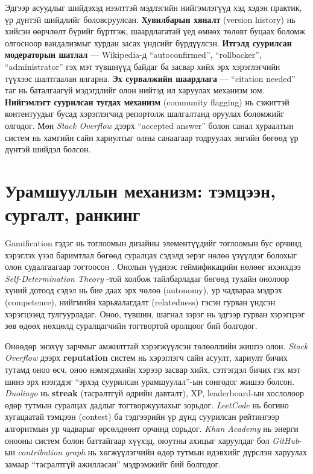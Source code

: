 Эдгээр асуудлыг шийдэхэд нээлттэй мэдлэгийн нийгэмлэгүүд хэд хэдэн практик, үр дүнтэй шийдлийг боловсруулсан. \textbf{Хувилбарын хяналт} (version history) нь хийсэн өөрчлөлт бүрийг бүртгэж, шаардлагатай үед өмнөх төлөвт буцаах боломж олгосноор вандализмыг хурдан засах үндсийг бүрдүүлсэн. \textbf{Итгэлд суурилсан модераторын шатлал} — Wikipedia-д ``autoconfirmed'', ``rollbacker'', ``administrator'' гэх мэт түвшнүүд байдаг ба засвар хийх эрх хэрэглэгчийн түүхээс шалтгаалан ялгарна. \textbf{Эх сурвалжийн шаардлага} — ``citation needed'' таг нь баталгаагүй мэдэгдлийг олон нийтэд ил харуулах механизм юм. \textbf{Нийгэмлэгт суурилсан тугдах механизм} (community flagging) нь сэжигтэй контентуудыг бусад хэрэглэгчид репортолж шалгалтанд оруулах боломжийг олгодог. Мөн \textit{Stack Overflow} дээрх ``accepted answer'' болон санал хураалтын систем нь хамгийн сайн хариултыг олны санаагаар тодруулах энгийн бөгөөд үр дүнтэй шийдэл болсон.


\section{Урамшууллын механизм: тэмцээн, сургалт, ранкинг}

Gamification гэдэг нь тоглоомын дизайны элементүүдийг тоглоомын бус орчинд хэрэглэх үзэл баримтлал бөгөөд суралцах сэдэлд эерэг нөлөө үзүүлдэг болохыг олон судалгаагаар тогтоосон \cite{Deterding2011}. Онолын үүднээс геймификацийн нөлөөг ихэнхдээ \textit{Self-Determination Theory} \cite{Deci2000}-той холбож тайлбарладаг бөгөөд тухайн онолоор хүний дотоод сэдэл нь бие даах эрх чөлөө (autonomy), ур чадвараа мэдрэх (competence), нийгмийн харьяалагдалт (relatedness) гэсэн гурван үндсэн хэрэгцээнд тулгуурладаг. Оноо, түвшин, шагнал зэрэг нь эдгээр гурван хэрэгцээг зөв өдөөх нөхцөлд суралцагчийн тогтвортой оролцоог бий болгодог.

Өнөөдөр энэхүү зарчмыг амжилттай хэрэгжүүлсэн төлөөллийн жишээ олон. \textit{Stack Overflow} дээрх \textbf{reputation} систем нь хэрэглэгч сайн асуулт, хариулт бичих тутамд оноо өсч, оноо нэмэгдэхийн хэрээр засвар хийх, сэтгэгдэл бичих гэх мэт шинэ эрх нээгддэг ``эрхэд суурилсан урамшуулал''-ын сонгодог жишээ болсон. \textit{Duolingo} нь \textbf{streak} (тасралтгүй өдрийн давталт), XP, leaderboard-ын хослолоор өдөр тутмын суралцах дадлыг тогтворжуулахыг зорьдог. \textit{LeetCode} нь богино хугацаатай тэмцээн (contest) ба тэдгээрийн үр дүнд суурилсан рейтингээр алгоритмын ур чадварыг өрсөлдөөнт орчинд сорьдог. \textit{Khan Academy} нь энерги онооны систем болон баттайгаар хүүхэд, оюутны ахицыг харуулдаг бол \textit{GitHub}-ын \textit{contribution graph} нь хөгжүүлэгчийн өдөр тутмын идэвхийг дүрслэн харуулах замаар ``тасралтгүй ажилласан'' мэдрэмжийг бий болгодог.


